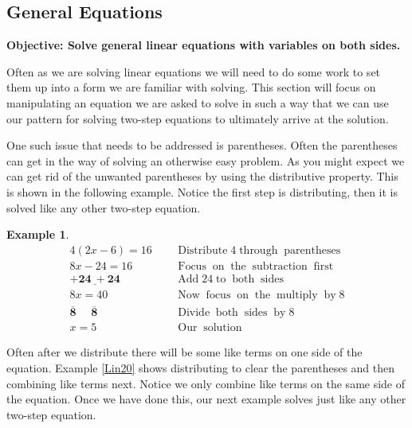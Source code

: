 \documentclass[12pt]{book}
\theoremstyle{definition}
\newtheorem{example}{Example}
\newcommand{\tmmathbf}[1]{\ensuremath{\boldsymbol{#1}}}
\newcommand{\tmop}[1]{\ensuremath{\operatorname{#1}}}
\begin{document}
\subsection{General Equations}
{\bf Objective: Solve general linear equations with variables on both sides.}\par
Often as we are solving linear equations we will need to do some work to set them up into a form we are familiar with solving. This section will focus on manipulating an equation we are asked to solve in such a way that we can use our pattern for solving two-step equations to ultimately arrive at the solution.\par
One such issue that needs to be addressed is parentheses. Often the parentheses can get in the way of solving an otherwise easy problem. As you might expect we can get rid of the unwanted parentheses by using the distributive property. This is shown in the following example. Notice the first step is distributing, then it is solved like any other two-step equation.
\begin{example}\label{Lin19}
  \begin{eqnarray*}
    4 (2 x - 6) = 16~~ &  & \tmop{Distribute} 4 \tmop{through}
    \tmop{parentheses}\\
    8 x - 24 = 16~~ &  & \tmop{Focus} \tmop{on} \tmop{the} \tmop{subtraction}
    \tmop{first}\\
    \tmmathbf{\underline{+ 24 ~+ 24}} &  & \tmop{Add} 24 \tmop{to} \tmop{both}
    \tmop{sides}\\
    8 x = 40~~ &  & \tmop{Now} \tmop{focus} \tmop{on} \tmop{the} \tmop{multiply}
    \tmop{by} 8\\
    \tmmathbf{ \overline{8} ~~~~~~ \overline{8}}~~ &  & \tmop{Divide} \tmop{both}
    \tmop{sides} \tmop{by} 8\\
    x = 5 &  & \tmop{Our} \tmop{solution}
  \end{eqnarray*}
\end{example}
Often after we distribute there will be some like terms on one side of the equation. Example \ref{Lin20} shows distributing to clear the parentheses and then combining like terms next. Notice we only combine like terms on the same side of the equation. Once we have done this, our next example solves just like any other two-step equation.
\end{document}
